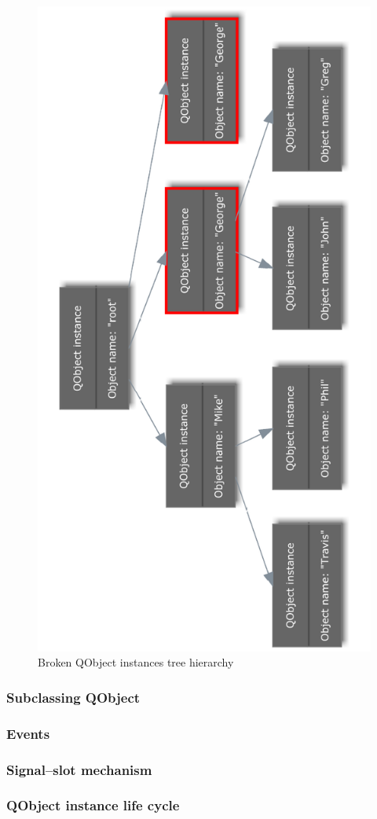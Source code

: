 \begin{figure}[ht]
\centering
\includegraphics[angle=-90,width=13cm]{graphics/laboratory/13-samenames.pdf}
\caption{Broken QObject instances tree hierarchy}\label{figure:samenames}
\end{figure}

\subsubsection{Subclassing QObject}

\subsubsection{Events}

\subsubsection{Signal--slot mechanism}

\subsubsection{QObject instance life cycle}
